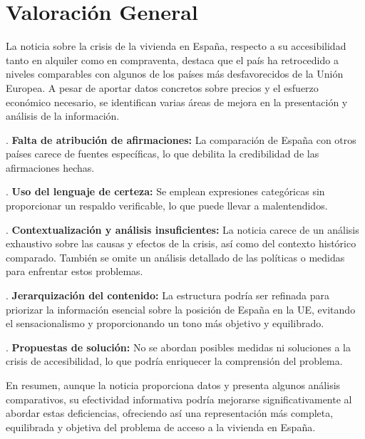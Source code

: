 \documentclass[10pt,a4paper]{article}
\begin{document}
\section*{Valoración General}
    La noticia sobre la crisis de la vivienda en Espa\~{n}a, respecto a su accesibilidad tanto en alquiler como en compraventa, destaca que el pa\'{i}s ha retrocedido a niveles comparables con algunos de los pa\'{i}ses m\'{a}s desfavorecidos de la Uni\'{o}n Europea. A pesar de aportar datos concretos sobre precios y el esfuerzo econ\'{o}mico necesario, se identifican varias \'{a}reas de mejora en la presentaci\'{o}n y an\'{a}lisis de la informaci\'{o}n.
\par{}. \textbf{Falta de atribuci\'{o}n de afirmaciones:} La comparaci\'{o}n de Espa\~{n}a con otros pa\'{i}ses carece de fuentes espec\'{i}ficas, lo que debilita la credibilidad de las afirmaciones hechas.
\par{}. \textbf{Uso del lenguaje de certeza:} Se emplean expresiones categ\'{o}ricas sin proporcionar un respaldo verificable, lo que puede llevar a malentendidos.
\par{}. \textbf{Contextualizaci\'{o}n y an\'{a}lisis insuficientes:} La noticia carece de un an\'{a}lisis exhaustivo sobre las causas y efectos de la crisis, as\'{i} como del contexto hist\'{o}rico comparado. Tambi\'{e}n se omite un an\'{a}lisis detallado de las pol\'{i}ticas o medidas para enfrentar estos problemas.
\par{}. \textbf{Jerarquizaci\'{o}n del contenido:} La estructura podr\'{i}a ser refinada para priorizar la informaci\'{o}n esencial sobre la posici\'{o}n de Espa\~{n}a en la UE, evitando el sensacionalismo y proporcionando un tono m\'{a}s objetivo y equilibrado.
\par{}. \textbf{Propuestas de soluci\'{o}n:} No se abordan posibles medidas ni soluciones a la crisis de accesibilidad, lo que podr\'{i}a enriquecer la comprensi\'{o}n del problema.
\par\medskip
En resumen, aunque la noticia proporciona datos y presenta algunos an\'{a}lisis comparativos, su efectividad informativa podr\'{i}a mejorarse significativamente al abordar estas deficiencias, ofreciendo as\'{i} una representaci\'{o}n m\'{a}s completa, equilibrada y objetiva del problema de acceso a la vivienda en Espa\~{n}a.
\vspace{1em}

\end{document}
